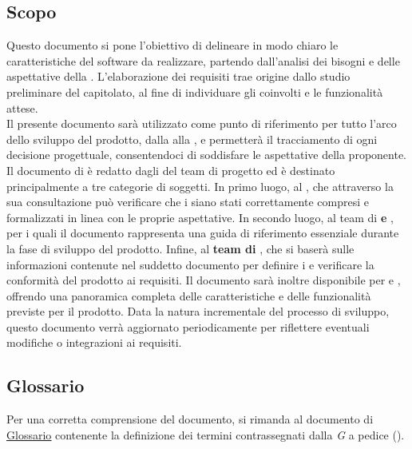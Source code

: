 \subsection{Scopo}
Questo documento si pone l'obiettivo di delineare in modo chiaro le caratteristiche del software da realizzare, partendo dall'analisi dei bisogni e delle aspettative della .
L'elaborazione dei requisiti trae origine dallo studio preliminare del capitolato, al fine di individuare gli  coinvolti e le funzionalità attese.\\
 
\noindent Il presente documento sarà utilizzato come punto di riferimento per tutto l'arco dello sviluppo del prodotto, dalla  alla , e permetterà il tracciamento di ogni decisione progettuale, consentendoci di soddisfare le aspettative della proponente.\\

\noindent Il documento di  è redatto dagli  del team di progetto ed è destinato principalmente a tre categorie di soggetti.
In primo luogo, al , che attraverso la sua consultazione può verificare che i  siano stati correttamente compresi e formalizzati in linea con le proprie aspettative.
In secondo luogo, al team di \textbf{ e }, per i quali il documento rappresenta una guida di riferimento essenziale durante la fase di sviluppo del prodotto.
Infine, al \textbf{team di }, che si baserà sulle informazioni contenute nel suddetto documento per definire i  e verificare la conformità del prodotto ai requisiti.
Il documento sarà inoltre disponibile per  e , offrendo una panoramica completa delle caratteristiche e delle funzionalità previste per il prodotto.
Data la natura incrementale del processo di sviluppo, questo documento verrà aggiornato periodicamente per riflettere eventuali modifiche o integrazioni ai requisiti.

\subsection{Glossario}
Per una corretta comprensione del documento, si rimanda al documento di \href{https://cdn.jsdelivr.net/gh/7-zpus/Docs@main/2_RTB/Glossario.pdf}{\ul{Glossario}} contenente la definizione dei termini contrassegnati dalla \textit{G} a pedice ().

